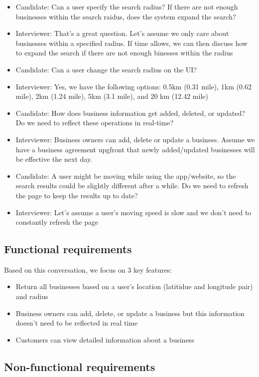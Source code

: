\documentclass{report}
\theoremstyle{definition}
\let\oldsubsection\subsection
\renewcommand{\subsection}{\oldsubsection*}
\begin{document}
\begin{itemize}
\item
Candidate: Can a user specify the search radius? If there are not enough businesses within the search raidus, does the system expand the search?
\item
Interviewer: That's a great question. Let's assume we only care about businesses within a specified radius. If time allows, we can then discuss how to expand the search if there are not enough binesses within the radius
\item
Candidate: Can a user change the search radius on the UI?
\item
Interviewer: Yes, we have the following options: 0.5km (0.31 mile), 1km (0.62 mile), 2km (1.24 mile), 5km (3.1 mile), and 20 km (12.42 mile)
\item
Candidate: How does business information get added, deleted, or updated? Do we need to reflect these operations in real-time?
\item
Interviewer: Business owners can add, delete or update a business. Assume we have a business agreement upgfront that newly added/updated businesses will be effective the next day.
\item
Candidate: A user might be moving while using the app/website, so the search results could be slightly different after a while. Do we need to refresh the page to keep the results up to date?
\item
Interviewer: Let's assume a user's moving speed is slow and we don't need to constantly refresh the page
\end{itemize}

\subsection{Functional requirements}

Based on this conversation, we focus on 3 key features:

\begin{itemize}
\item
Return all businesses based on a user's location (latitidue and longitude pair) and radius
\item
Business owners can add, delete, or update a business but this information doesn't need to be reflected in real time
\item
Customers can view detailed information about a business
\end{itemize}

\subsection{Non-functional requirements}
\end{document}
